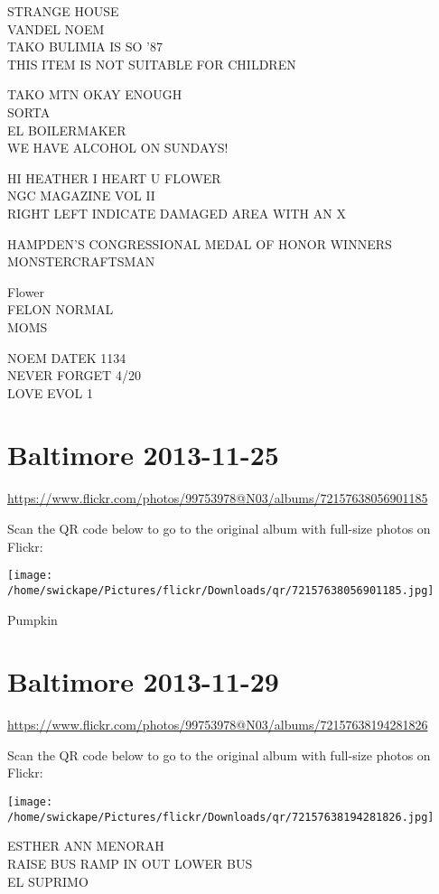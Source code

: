 \documentclass[10pt,letterpaper]{article}
\begin{document}
STRANGE HOUSE\\
VANDEL NOEM\\
TAKO BULIMIA IS SO '87\\
THIS ITEM IS NOT SUITABLE FOR CHILDREN

TAKO MTN OKAY ENOUGH\\
SORTA\\
EL BOILERMAKER\\
WE HAVE ALCOHOL ON SUNDAYS!

HI HEATHER I HEART U FLOWER\\
NGC MAGAZINE VOL II\\
RIGHT LEFT INDICATE DAMAGED AREA WITH AN X

HAMPDEN'S CONGRESSIONAL MEDAL OF HONOR WINNERS\\
MONSTERCRAFTSMAN

Flower\\
FELON NORMAL\\
MOMS

NOEM DATEK 1134\\
NEVER FORGET 4/20\\
LOVE EVOL 1
\pagebreak

\section*{Baltimore 2013-11-25}

\url{https://www.flickr.com/photos/99753978@N03/albums/72157638056901185}

Scan the QR code below to go to the original album with full-size photos on Flickr:

\texttt{[image: /home/swickape/Pictures/flickr/Downloads/qr/72157638056901185.jpg]}
\pagebreak

Pumpkin
\pagebreak

\section*{Baltimore 2013-11-29}

\url{https://www.flickr.com/photos/99753978@N03/albums/72157638194281826}

Scan the QR code below to go to the original album with full-size photos on Flickr:

\texttt{[image: /home/swickape/Pictures/flickr/Downloads/qr/72157638194281826.jpg]}
\pagebreak

ESTHER ANN MENORAH\\
RAISE BUS RAMP IN OUT LOWER BUS\\
EL SUPRIMO
\end{document}
